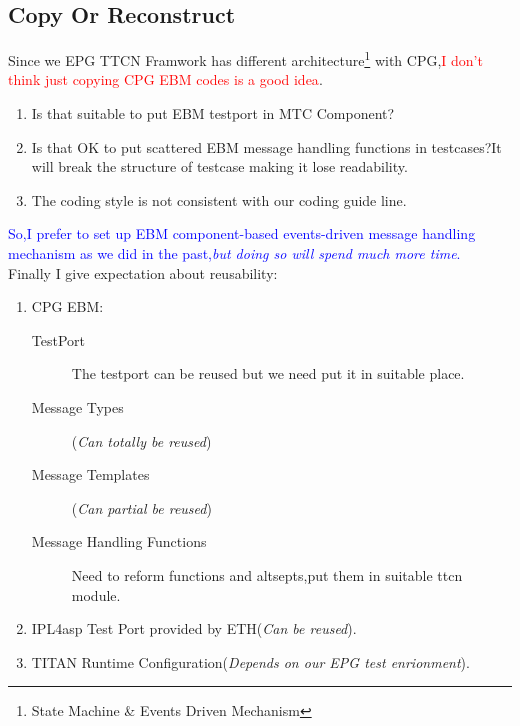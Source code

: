\documentclass[a4paper,11pt]{article}
\begin{document}
\subsection{Copy Or Reconstruct}
Since we EPG TTCN Framwork has different architecture\footnote{State Machine \& Events Driven Mechanism} with CPG,\textcolor{red}{I don't think just copying CPG EBM codes is a good idea}.
\flushleft
\begin{enumerate}
\item Is that suitable to put EBM testport in MTC Component?
\item Is that OK to put scattered EBM message handling functions in testcases?It will break the structure of testcase making it lose readability.
\item The coding style is not consistent with our coding guide line.
\end{enumerate}
{\textcolor {blue}{
So,I prefer to set up EBM component-based events-driven message handling mechanism as we did in the past,\emph{but doing so will spend much more time}.
}
}\\
Finally I give expectation about reusability:\\
\flushleft
\begin{enumerate}
\item CPG EBM:
\begin{description}
\item[TestPort] The testport can be reused but we need put it in suitable place.
\item[Message Types] (\emph{Can totally be reused})
\item[Message Templates] (\emph{Can partial be reused})
\item[Message Handling Functions] Need to reform functions and altsepts,put them in suitable ttcn module.
\end{description}
\item IPL4asp Test Port provided by ETH(\emph{Can be reused}).
\item TITAN Runtime Configuration(\emph{Depends on our EPG test enrionment}).
\end{enumerate}
\end{document}
